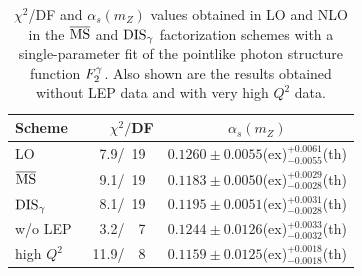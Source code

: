 \documentclass[aps,prl,twocolumn,groupedaddress]{revtex4}
\begin{document}
\begin{table}
\caption{\label{tab:1}$\chi^2$/DF and $\alpha_s(m_Z)$ values obtained in LO and
         NLO in the $\overline{\rm MS}$ and ${\rm DIS}_\gamma$ factorization schemes with a
         single-parameter fit of
         the pointlike photon structure function $\f2y$. Also shown are the 
         results obtained without LEP data and with very high $Q^2$ data.}
\begin{ruledtabular}
\begin{tabular}{llc}
       Scheme & ~~~$\chi^2/$DF& $\alpha_s(m_Z)$ \\
\hline
       LO     & ~~7.9/~19& $0.1260\pm0.0055$(ex)$^{+0.0061}_{-0.0055}$(th) \\
       $\overline{\rm MS}$  & ~~9.1/~19& $0.1183\pm0.0050$(ex)$^{+0.0029}_{-0.0028}$(th) \\
       ${\rm DIS}_\gamma$& ~~8.1/~19& $0.1195\pm0.0051$(ex)$^{+0.0031}_{-0.0028}$(th) \\
\hline
        w/o LEP &~~3.2/~~7& $0.1244\pm0.0126$(ex)$^{+0.0033}_{-0.0032}$(th) \\
        high $Q^2$ &~11.9/~~8& $0.1159\pm0.0125$(ex)$^{+0.0018}_{-0.0018}$(th) \\
\end{tabular}
\end{ruledtabular}
\end{table}
%
\end{document}
